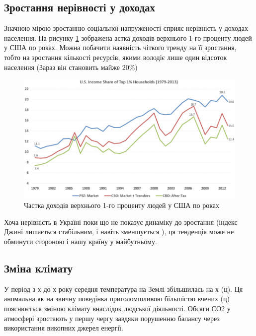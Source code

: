     \subsection{Зростання нерівності у доходах}
        
        Значною мірою зростанню соціальної напруженості сприяє нерівність у доходах населення. На рисунку \ref{fig:income_us}
        зображена астка доходів верхнього 1-го проценту людей у США по роках. Можна побачити наявність чіткого тренду на її зростання,
        тобто на зростання кількості ресурсів, якими володіє лише один відсоток населення (Зараз він становить майже 20\%)

        \begin{figure}[!htp]
            \centering
            \includegraphics[scale = 0.7]{PNG/income_us.png}
            \caption{Частка доходів верхнього 1-го проценту людей у США по роках}
            \label{fig:income_us}
        \end{figure}

        Хоча нерівність в Україні поки що не показує динаміку до зростання (індекс Джині лишається стабільним, і навіть зменшується
        \cite{giniukr}), ця тенденція може не обминути стороною і нашу країну у майбутньому.

    \subsection{Змiна клiмату}

        У період з х до х року середня температура на Землі збільшилась на х (ц). Ця аномальна як на звичну поведінка 
        приголомшливою більшістю вчених (ц) пояснюється зміною клімату внаслідок людської діяльності. Обсяги СО2 у атмосфері зростають
        у першу чергу завдяки порушенню балансу через використання викопних джерел енергії. 

